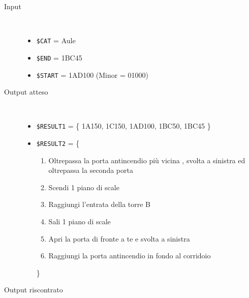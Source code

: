 \documentclass[../../SperimentazioniPratiche.tex]{subfiles}
\begin{document}
			\begin{tcolorbox}[fonttitle=\bfseries, 
								adjusted title={\Large Prova 1C.1}, 
								breakable, 
								sharp corners=south,
								colback=white, 
								colframe=white!60!black]
								
				\begin{description}%
				
					\item[Input] \ \par 
        				\begin{itemize}
        					\item \verb|$CAT| = Aule
							\item \verb|$END| = 1BC45
							\item \verb|$START| = 1AD100 (Minor = 01000)
        				\end{itemize}
        				
        			\tcbline 
        				
        			\item[Output atteso] \ \par
        				\begin{itemize}
        				
        					\item \verb|$RESULT1| = \{
        						1A150, 1C150, 1AD100, 1BC50, 1BC45
        					\}
        				
        					\item \verb|$RESULT2| = \{
        					\begin{enumerate}
        						\item Oltrepassa la porta antincendio più vicina , svolta a sinistra ed oltrepassa la seconda porta
        						\item Scendi 1 piano di scale
        						\item Raggiungi l'entrata della torre B
        						\item Sali 1 piano di scale
        						\item Apri la porta di fronte a te e svolta a sinistra
        						\item Raggiungi la porta antincendio in fondo al corridoio
        					\end{enumerate}
        					\}
        					
        				\end{itemize}

					\tcbline				
        				
        			\item[Output riscontrato] \ \par
        				\begin{description}
        				

\end{description}
\end{description}
\end{tcolorbox}
\end{document}
